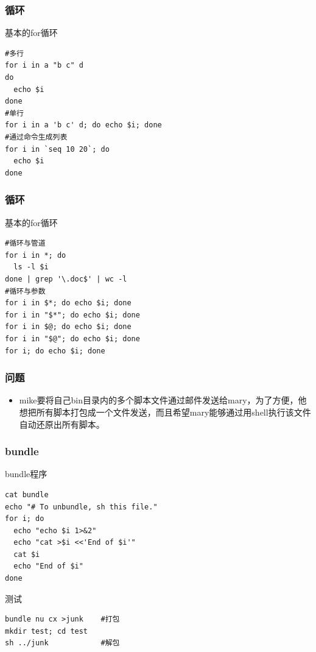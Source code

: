 \documentclass[xcolor=svgnames,presentation]{beamer}
\begin{document}
\begin{frame}[fragile]
\frametitle{循环}
\label{sec-1-1-16}
\begin{exampleblock}{基本的for循环}
\label{sec-1-1-16-1}


\begin{verbatim}
#多行
for i in a "b c" d
do
  echo $i
done
#单行
for i in a 'b c' d; do echo $i; done
#通过命令生成列表
for i in `seq 10 20`; do
  echo $i
done
\end{verbatim}
\end{exampleblock}
\end{frame}
\begin{frame}[fragile]
\frametitle{循环}
\label{sec-1-1-17}
\begin{block}{基本的for循环}
\label{sec-1-1-17-1}


\begin{verbatim}
#循环与管道
for i in *; do
  ls -l $i
done | grep '\.doc$' | wc -l
#循环与参数
for i in $*; do echo $i; done
for i in "$*"; do echo $i; done
for i in $@; do echo $i; done
for i in "$@"; do echo $i; done
for i; do echo $i; done
\end{verbatim}
\end{block}
\end{frame}
\begin{frame}
\frametitle{问题}
\label{sec-1-1-18}
\begin{itemize}

\item mike要将自己bin目录内的多个脚本文件通过邮件发送给mary，为了方便，他想把所有脚本打包成一个文件发送，而且希望mary能够通过用shell执行该文件自动还原出所有脚本。
\label{sec-1-1-18-1}%
\end{itemize} %
\end{frame}
\begin{frame}[fragile]
\frametitle{bundle}
\label{sec-1-1-19}
\begin{exampleblock}{bundle程序}
\label{sec-1-1-19-1}


\begin{verbatim}
cat bundle
echo "# To unbundle, sh this file."
for i; do
  echo "echo $i 1>&2"
  echo "cat >$i <<'End of $i'"
  cat $i
  echo "End of $i"
done
\end{verbatim}
\end{exampleblock}
\begin{block}{测试}
\label{sec-1-1-19-2}


\begin{verbatim}
bundle nu cx >junk    #打包
mkdir test; cd test
sh ../junk            #解包
\end{verbatim}
\end{block}
\end{frame}
\end{document}

